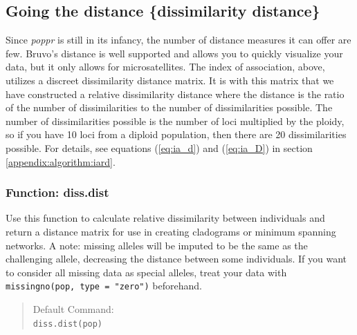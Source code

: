 \documentclass[letterpaper]{article}
\newcommand{\tab}{\hspace*{1em}}
\begin{document}
\subsection{Going the distance \{dissimilarity distance\}}\label{index:dist}
\tab\tab Since \textit{poppr} is still in its infancy, the number of distance measures it can offer are few. Bruvo's distance is well supported and allows you to quickly visualize your data, but it only allows for microsatellites. The index of association, above, utilizes a discreet dissimilarity distance matrix. It is with this matrix that we have constructed a relative dissimilarity distance where the distance is the ratio of the number of dissimilarities to the number of dissimilarities possible. The number of dissimilarities possible is the number of loci multiplied by the ploidy, so if you have 10 loci from a diploid population, then there are 20 dissimilarities possible. For details, see equations (\ref{eq:ia_d}) and (\ref{eq:ia_D}) in section \ref{appendix:algorithm:iard}. 

\subsubsection{Function: diss.dist}\label{index:dist:diss.dist}

\tab\tab Use this function to calculate relative dissimilarity between individuals and return a distance matrix for use in creating cladograms or minimum spanning networks. A note: missing alleles will be imputed to be the same as the challenging allele, decreasing the distance between some individuals. If you want to consider all missing data as special alleles, treat your data with \texttt{missingno(pop, type = "zero")} beforehand. 

\begin{quote}
Default Command:\\
\texttt{diss.dist(pop)}
\end{quote}
\end{document}
